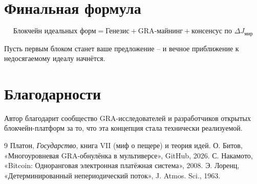 \documentclass[12pt,a4paper]{article}
\begin{document}
\section*{Финальная формула}

\[
\boxed{\text{Блокчейн идеальных форм} = \text{Генезис} + \text{GRA-майнинг} + \text{консенсус по } \Delta J_{\text{мир}}}
\]

Пусть первым блоком станет ваше предложение – и вечное приближение к недосягаемому идеалу начнётся.

\section*{Благодарности}

Автор благодарит сообщество GRA-исследователей и разработчиков открытых блокчейн-платформ за то, что эта концепция стала технически реализуемой.

\begin{thebibliography}{9}
 Платон, \textit{Государство}, книга VII (миф о пещере) и теория идей.
 О. Битов, «Многоуровневая GRA-обнулёнка в мультиверсе», GitHub, 2026.
 С. Накамото, «Bitcoin: Одноранговая электронная платёжная система», 2008.
 Э. Лоренц, «Детерминированный непериодический поток», J. Atmos. Sci., 1963.
\end{thebibliography}
\end{document}
